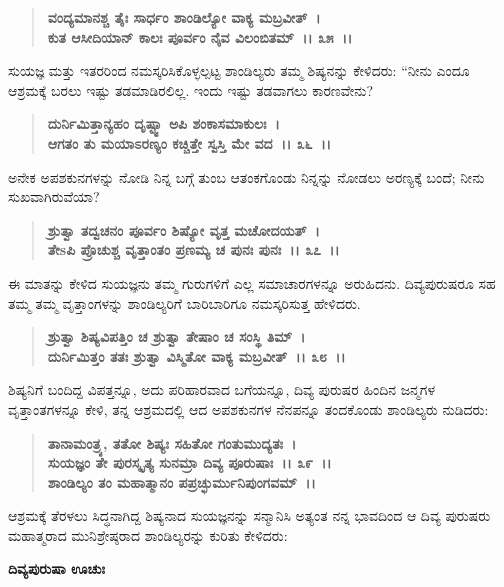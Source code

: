 \begin{verse}
\textbf{ವಂದ್ಯಮಾನಶ್ಚ ತೈಃ ಸಾರ್ಧಂ ಶಾಂಡಿಲ್ಯೋ ವಾಕ್ಯ ಮಬ್ರವೀತ್~।}\\\textbf{ಕುತ ಆಸೀದಿಯಾನ್ ಕಾಲಃ ಪೂರ್ವಂ ನೈವ ವಿಲಂಬಿತಮ್~।। ೩೫~।।}
\end{verse}

ಸುಯಜ್ಞ ಮತ್ತು ಇತರರಿಂದ ನಮಸ್ಕರಿಸಿಕೊಳ್ಳಲ್ಪಟ್ಟ ಶಾಂಡಿಲ್ಯರು ತಮ್ಮ ಶಿಷ್ಯನನ್ನು ಕೇಳಿದರು: “ನೀನು ಎಂದೂ ಆಶ್ರಮಕ್ಕೆ ಬರಲು ಇಷ್ಟು ತಡಮಾಡಿರಲಿಲ್ಲ. ಇಂದು ಇಷ್ಟು ತಡ\-ವಾಗಲು ಕಾರಣವೇನು?

\begin{verse}
\textbf{ದುರ್ನಿಮಿತ್ತಾನ್ಯಹಂ ದೃಷ್ಟ್ವಾ ಅಪಿ ಶಂಕಾಸಮಾಕುಲಃ~।}\\\textbf{ಆಗತಂ ತು ಮಯಾಽರಣ್ಯಂ ಕಚ್ಚಿತ್ತೇ ಸ್ವಸ್ತಿ ಮೇ ವದ~।। ೩೬~।।}
\end{verse}

ಅನೇಕ ಅಪಶಕುನಗಳನ್ನು ನೋಡಿ ನಿನ್ನ ಬಗ್ಗೆ ತುಂಬ ಆತಂಕಗೊಂಡು ನಿನ್ನನ್ನು ನೋಡಲು ಅರಣ್ಯಕ್ಕೆ ಬಂದೆ; ನೀನು ಸುಖವಾಗಿರುವೆಯಾ?

\begin{verse}
\textbf{ಶ್ರುತ್ವಾ ತದ್ವಚನಂ ಪೂರ್ವಂ ಶಿಷ್ಯೋ ವೃತ್ತ ಮಚೋದಯತ್~।}\\\textbf{ತೇsಪಿ ಪ್ರೊಚುಶ್ಚ ವೃತ್ತಾಂತಂ ಪ್ರಣಮ್ಯ ಚ ಪುನಃ ಪುನಃ~।। ೩೭~।।}
\end{verse}

ಈ ಮಾತನ್ನು ಕೇಳಿದ ಸುಯಜ್ಞನು ತಮ್ಮ ಗುರುಗಳಿಗೆ ಎಲ್ಲ ಸಮಾಚಾರಗಳನ್ನೂ ಅರುಹಿದನು. ದಿವ್ಯಪುರುಷರೂ ಸಹ ತಮ್ಮ ತಮ್ಮ ವೃತ್ತಾಂಗಳನ್ನು ಶಾಂಡಿಲ್ಯರಿಗೆ ಬಾರಿಬಾರಿಗೂ ನಮಸ್ಕರಿಸುತ್ತ ಹೇಳಿದರು.

\begin{verse}
\textbf{ಶ್ರುತ್ವಾ ಶಿಷ್ಯವಿಪತ್ತಿಂ ಚ ಶ್ರುತ್ವಾ ತೇಷಾಂ ಚ ಸಂಸ್ಥಿ ತಿಮ್~।}\\\textbf{ದುರ್ನಿಮಿತ್ತಂ ತತಃ ಶ್ರುತ್ವಾ ವಿಸ್ಮಿತೋ ವಾಕ್ಯ ಮಬ್ರವೀತ್~।। ೩೮~।।}
\end{verse}

ಶಿಷ್ಯನಿಗೆ ಬಂದಿದ್ದ ವಿಪತ್ತನ್ನೂ, ಅದು ಪರಿಹಾರವಾದ ಬಗೆಯನ್ನೂ, ದಿವ್ಯ ಪುರುಷರ ಹಿಂದಿನ ಜನ್ಮಗಳ ವೃತ್ತಾಂತಗಳನ್ನೂ ಕೇಳಿ, ತನ್ನ ಆಶ್ರಮದಲ್ಲಿ ಆದ ಅಪಶಕುನಗಳ ನೆನಪನ್ನೂ ತಂದಕೊಂಡು ಶಾಂಡಿಲ್ಯರು ನುಡಿದರು:

\begin{verse}
\textbf{ತಾನಾಮಂತ್ರ್ಯ, ತತೋ ಶಿಷ್ಯಃ ಸಹಿತೋ ಗಂತುಮುದ್ಯತಃ~।}\\\textbf{ಸುಯಜ್ಞಂ ತೇ ಪುರಸ್ಕೃತ್ಯ ಸುನಮ್ರಾ ದಿವ್ಯ ಪೂರುಷಾಃ~।। ೩೯~।।}\\\textbf{ಶಾಂಡಿಲ್ಯಂ ತಂ ಮಹಾತ್ಮಾನಂ ಪಪ್ರಚ್ಛುರ್ಮುನಿಪುಂಗವಮ್~।।}
\end{verse}

ಆಶ್ರಮಕ್ಕೆ ತೆರಳಲು ಸಿದ್ಧನಾಗಿದ್ದ ಶಿಷ್ಯನಾದ ಸುಯಜ್ಞನನ್ನು ಸನ್ಮಾನಿಸಿ ಅತ್ಯಂತ ನನ್ನ ಭಾವದಿಂದ ಆ ದಿವ್ಯ ಪುರುಷರು ಮಹಾತ್ಮರಾದ ಮುನಿಶ್ರೇಷ್ಠರಾದ ಶಾಂಡಿಲ್ಯರನ್ನು ಕುರಿತು ಕೇಳಿದರು:

\begin{flushleft}
\textbf{ದಿವ್ಯಪುರುಷಾ ಊಚುಃ\enginline{-}}
\end{flushleft}

